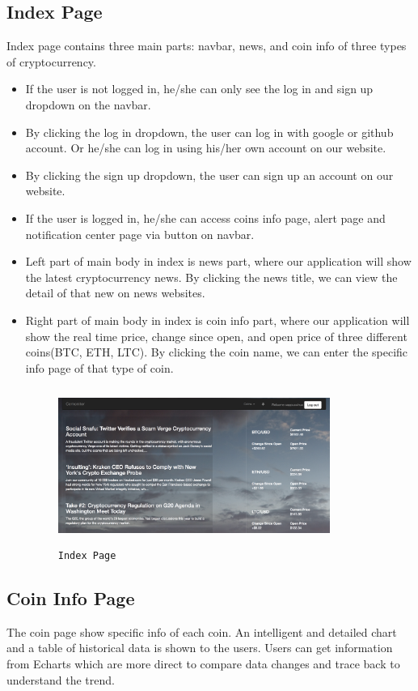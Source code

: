 \subsection{Index Page}
Index page contains three main parts: navbar, news, and coin info of three types 
of cryptocurrency.
\begin{itemize}
\item If the user is not logged in, he/she can only see the log in and sign up
dropdown on the navbar. 
\item By clicking the log in dropdown, the user can log in with google or github
account. Or he/she can log in using his/her own account on our website.
\item By clicking the sign up dropdown, the user can sign up an account on our 
website.
\item If the user is logged in, he/she can access coins info page, alert page
and notification center page via button on navbar.
\item Left part of main body in index is news part, where our application will
show the latest cryptocurrency news. By clicking the news title, we can view the
detail of that new on news websites.
\item Right part of main body in index is coin info part, where our application 
will show the real time price, change since open, and open price of three different 
coins(BTC, ETH, LTC). By clicking the coin name, we can enter the specific info 
page of that type of coin.
\begin{figure}[!htb]
\includegraphics[height=2.0in, width=3.5in]{index.png}
\caption{\texttt{Index Page}}
\end{figure}
\end{itemize}

\subsection{Coin Info Page}
The coin page show specific info of each coin. An intelligent and detailed chart 
and a table of historical data is shown to the users. Users can get information 
from Echarts which are more direct to compare data changes and trace back to understand the trend.

